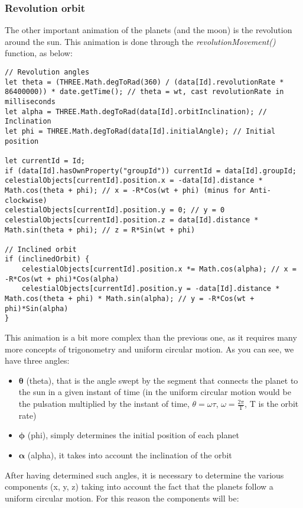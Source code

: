 \documentclass{article}
\begin{document}
\subsubsection{Revolution orbit}
The other important animation of the planets (and the moon) is the revolution around the sun. This animation is done through the \textit{revolutionMovement()} function, as below:
\begin{lstlisting}
// Revolution angles
let theta = (THREE.Math.degToRad(360) / (data[Id].revolutionRate * 86400000)) * date.getTime(); // theta = wt, cast revolutionRate in milliseconds
let alpha = THREE.Math.degToRad(data[Id].orbitInclination); // Inclination
let phi = THREE.Math.degToRad(data[Id].initialAngle); // Initial position

let currentId = Id;
if (data[Id].hasOwnProperty("groupId")) currentId = data[Id].groupId;
celestialObjects[currentId].position.x = -data[Id].distance * Math.cos(theta + phi); // x = -R*Cos(wt + phi) (minus for Anti-clockwise)
celestialObjects[currentId].position.y = 0; // y = 0
celestialObjects[currentId].position.z = data[Id].distance * Math.sin(theta + phi); // z = R*Sin(wt + phi)

// Inclined orbit
if (inclinedOrbit) {
	celestialObjects[currentId].position.x *= Math.cos(alpha); // x = -R*Cos(wt + phi)*Cos(alpha)
	celestialObjects[currentId].position.y = -data[Id].distance * Math.cos(theta + phi) * Math.sin(alpha); // y = -R*Cos(wt + phi)*Sin(alpha)
}
\end{lstlisting}
This animation is a bit more complex than the previous one, as it requires many more concepts of trigonometry and uniform circular motion.
As you can see, we have three angles:
\begin{itemize}
	\item $\mathbf{\theta}$ (theta), that is the angle swept by the segment that connects the planet to the sun in a given instant of time (in the uniform circular motion would be the pulsation multiplied by the instant of time, $\theta = \omega\tau$, $\omega = \frac{2\pi}{\textrm{T}}$, \textrm{T} is the orbit rate)
	\item $\mathbf{\phi}$ (phi), simply determines the initial position of each planet
	\item $\mathbf{\alpha}$ (alpha), it takes into account the inclination of the orbit
\end{itemize}
After having determined such angles, it is necessary to determine the various components (x, y, z) taking into account the fact that the planets follow a uniform circular motion. For this reason the components will be:
\end{document}
